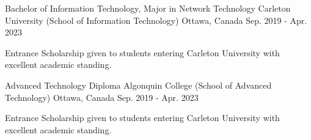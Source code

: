 

\begin{cventries}

  \cventry
    {Bachelor of Information Technology, Major in Network Technology} %
    {Carleton University (School of Information Technology)} %
    {Ottawa, Canada} %
    {Sep. 2019 - Apr. 2023} %
    {
      \begin{cvitems} %
        \item {Entrance Scholarship given to students entering Carleton University with excellent academic standing.}
      \end{cvitems}
    }

  \cventry
    {Advanced Technology Diploma} %
    {Algonquin College (School of Advanced Technology)} %
    {Ottawa, Canada} %
    {Sep. 2019 - Apr. 2023} %
    {
      \begin{cvitems} %
        \item {Entrance Scholarship given to students entering Carleton University with excellent academic standing.}
      \end{cvitems}
    }
\end{cventries}
